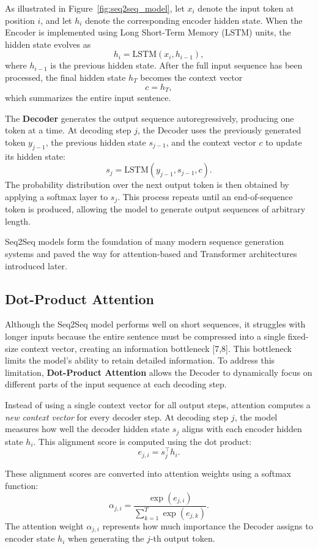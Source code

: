 \documentclass{article}
\renewcommand{\cite}[1]{[#1]}
\begin{document}
As illustrated in Figure~\ref{fig:seq2seq_model}, let \( x_i \) denote the input token at position \( i \), and let \( h_i \) denote the corresponding encoder hidden state. When the Encoder is implemented using Long Short-Term Memory (LSTM) units, the hidden state evolves as
\[
h_i = \text{LSTM}(x_i, h_{i-1}),
\]
where \( h_{i-1} \) is the previous hidden state. After the full input sequence has been processed, the final hidden state \( h_T \) becomes the context vector
\[
c = h_T,
\]
which summarizes the entire input sentence.

The \textbf{Decoder} generates the output sequence autoregressively, producing one token at a time. At decoding step \( j \), the Decoder uses the previously generated token \( y_{j-1} \), the previous hidden state \( s_{j-1} \), and the context vector \( c \) to update its hidden state:
\[
s_j = \text{LSTM}(y_{j-1}, s_{j-1}, c).
\]
The probability distribution over the next output token is then obtained by applying a softmax layer to \( s_j \). This process repeats until an end-of-sequence token is produced, allowing the model to generate output sequences of arbitrary length.

Seq2Seq models form the foundation of many modern sequence generation systems and paved the way for attention-based and Transformer architectures introduced later.

\subsection{Dot-Product Attention}

Although the Seq2Seq model performs well on short sequences, it struggles with longer inputs because the entire sentence must be compressed into a single fixed-size context vector, creating an information bottleneck \cite{7,8}. This bottleneck limits the model’s ability to retain detailed information. To address this limitation, \textbf{Dot-Product Attention} allows the Decoder to dynamically focus on different parts of the input sequence at each decoding step.

Instead of using a single context vector for all output steps, attention computes a \emph{new context vector} for every decoder step. At decoding step \( j \), the model measures how well the decoder hidden state \( s_j \) aligns with each encoder hidden state \( h_i \). This alignment score is computed using the dot product:
\[
e_{j,i} = s_j^{\top} h_i.
\]

These alignment scores are converted into attention weights using a softmax function:
\[
\alpha_{j,i} = 
\frac{\exp(e_{j,i})}
{\sum_{k=1}^{T} \exp(e_{j,k})}.
\]
The attention weight \( \alpha_{j,i} \) represents how much importance the Decoder assigns to encoder state \( h_i \) when generating the \( j \)-th output token.
\end{document}
